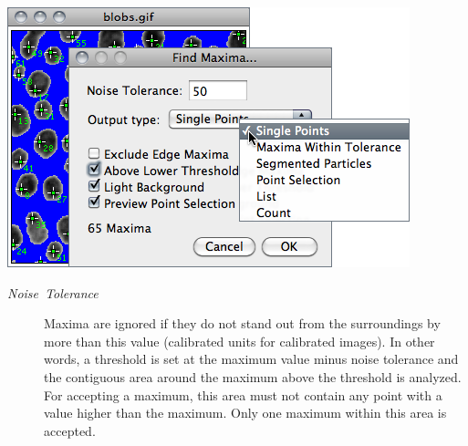 \begin{minipage}[c][1\totalheight][t]{0.592\columnwidth}%
\includegraphics[scale=0.55]{images/FindMaxima}%
\end{minipage}%
\begin{minipage}[c][1\totalheight][t]{0.408\columnwidth}%
\begin{description}
\item [{\emph{Noise\ Tolerance}}] Maxima are ignored if they do not stand
out from the surroundings by more than this value (calibrated units
for calibrated images). In other words, a threshold is set at the
maximum value minus noise tolerance and the contiguous area around
the maximum above the threshold is analyzed. For accepting a maximum,
this area must not contain any point with a value higher than the
maximum. Only one maximum within this area is accepted.\end{description}
%
\end{minipage}
